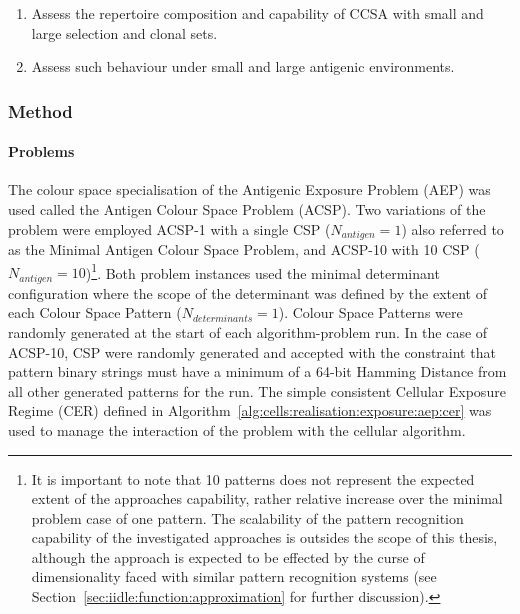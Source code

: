 \begin{enumerate}
	\item Assess the repertoire composition and capability of CCSA with small and large selection and clonal sets.
	\item Assess such behaviour under small and large antigenic environments.
\end{enumerate}

%
%
\subsubsection{Method}

%
%
\paragraph{Problems}
The colour space specialisation of the Antigenic Exposure Problem (AEP) was used called the Antigen Colour Space Problem (ACSP). Two variations of the problem were employed ACSP-1 with a single CSP ($N_{antigen}=1$) also referred to as the Minimal Antigen Colour Space Problem, and ACSP-10 with 10 CSP ($N_{antigen}=10$)\footnote{It is important to note that 10 patterns does not represent the expected extent of the approaches capability, rather relative increase over the minimal problem case of one pattern. The scalability of the pattern recognition capability of the investigated approaches is outsides the scope of this thesis, although the approach is expected to be effected by the curse of dimensionality faced with similar pattern recognition systems (see Section~\ref{sec:iidle:function:approximation} for further discussion).}. Both problem instances used the minimal determinant configuration where the scope of the determinant was defined by the extent of each Colour Space Pattern ($N_{determinants}=1$). Colour Space Patterns were randomly generated at the start of each algorithm-problem run. In the case of ACSP-10, CSP were randomly generated and accepted with the constraint that pattern binary strings must have a minimum of a 64-bit Hamming Distance from all other generated patterns for the run. The simple consistent Cellular Exposure Regime (CER) defined in Algorithm~\ref{alg:cells:realisation:exposure:aep:cer} was used to manage the interaction of the problem with the cellular algorithm.

% 
%
